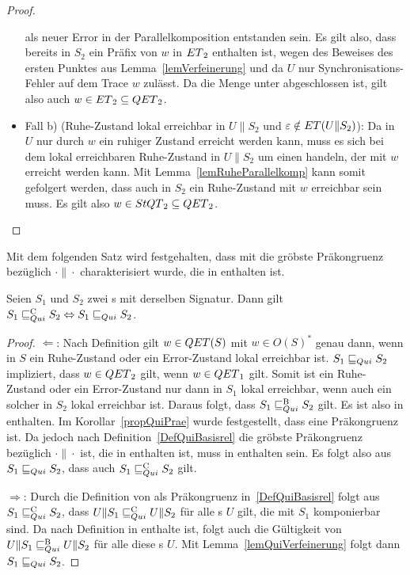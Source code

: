 \begin{proof}
\begin{itemize}
      als neuer Error in der Parallelkomposition entstanden sein. Es gilt
      also, dass bereits in $S_2$ ein Präfix von $w$ in $ET{}_2$ enthalten
      ist, wegen des Beweises des ersten Punktes aus
      Lemma~\ref{lemVerfeinerung} und da $U$ nur Synchronisations-Fehler
      auf dem Trace $w$ zulässt. Da die Menge \ET{} unter \cont{}
      abgeschlossen ist, gilt also auch $w\in ET{}_2\subseteq QET{}_2$.
    \item Fall b) (Ruhe-Zustand lokal erreichbar in $U\|S_2$ und
      $\varepsilon\notin ET{}(U\|S_2)$): Da in $U$
      nur durch $w$ ein ruhiger Zustand erreicht werden kann, muss es sich
      bei dem lokal erreichbaren Ruhe-Zustand in $U\|S_2$ um einen handeln,
      der mit $w$ erreicht werden kann. Mit Lemma~\ref{lemRuheParallelkomp}
      kann somit gefolgert werden, dass auch in $S_2$ ein Ruhe-Zustand mit
      $w$ erreichbar sein muss. Es gilt also $w\in StQT{}_2\subseteq
      QET{}_2$.
  \end{itemize}
\end{proof}

Mit dem folgenden Satz wird festgehalten, dass mit \QRel{} die gröbste
Präkongruenz bezüglich $\cdot\|\cdot$ charakterisiert wurde, die in \QBRel{}
enthalten ist.

\begin{satz}
\label{satzQuiFullAbst}
  Seien $S_1$ und $S_2$ zwei \EIO{}s mit derselben Signatur. Dann gilt
  $S_1\sqsubseteq _{Qui}^\mathrm{C} S_2\Leftrightarrow S_1\sqsubseteq _{Qui} S_2$.
\end{satz}

\begin{proof}
  \glqq{}$\Leftarrow$\grqq{}: Nach Definition gilt $w\in QET{}(S)$ mit $w\in
  O(S)^*$ genau dann, wenn in $S$ ein Ruhe-Zustand oder ein Error-Zustand lokal
  erreichbar ist. $S_1\sqsubseteq _{Qui} S_2$ impliziert, dass $w\in QET{}_2$ gilt, wenn
  $w\in QET{}_1$ gilt. Somit ist ein Ruhe-Zustand oder ein Error-Zustand nur dann in
  $S_1$ lokal erreichbar, wenn auch ein solcher in $S_2$ lokal erreichbar ist.
  Daraus folgt, dass $S_1\sqsubseteq _{Qui}^\mathrm{B} S_2$ gilt. Es ist also \QRel{} in \QBRel{}
  enthalten. Im Korollar~\ref{propQuiPrae} wurde festgestellt, dass \QRel{}
  eine Präkongruenz ist. Da jedoch \QCRel{} nach Definition~\ref{DefQuiBasisrel} die gröbste
  Präkongruenz bezüglich $\cdot\|\cdot$ ist, die in \QBRel{} enthalten ist,
  muss \QRel{} in \QCRel{} enthalten sein. Es folgt also aus $S_1\sqsubseteq _{Qui} S_2$,
  dass auch $S_1\sqsubseteq _{Qui}^\mathrm{C} S_2$ gilt.

  \glqq{}$\Rightarrow$\grqq{}: Durch die Definition von \QCRel{} als
  Präkongruenz in~\ref{DefQuiBasisrel} folgt aus $S_1\sqsubseteq _{Qui}^\mathrm{C}{} S_2$, dass
  $U\|S_1\sqsubseteq _{Qui}^\mathrm{C} U\|S_2$ für alle \EIO{}s $U$ gilt, die mit $S_1$ komponierbar sind.
  Da \QCRel{} nach Definition in \QBRel{} enthalte ist, folgt auch die
  Gültigkeit von $U\|S_1\sqsubseteq _{Qui}^\mathrm{B} U\|S_2$ für alle diese \EIO{}s
  $U$. Mit Lemma~\ref{lemQuiVerfeinerung} folgt dann $S_1\sqsubseteq _{Qui}{} S_2$.
\end{proof}

